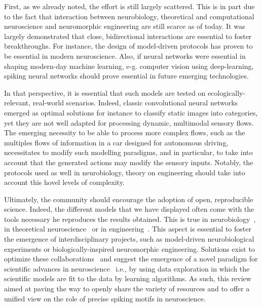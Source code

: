 \documentclass[brainsci, %
               review,submit,pdftex,moreauthors
               ]{Definitions/mdpi}
\begin{document}
First, as we already noted, the effort is still largely scattered. This is in part due to the fact that interaction between neurobiology, theoretical and computational neuroscience and neuromorphic engineering are still scarce as of today. It was largely demonstrated that close, bidirectional interactions are essential to foster breakthroughs. For instance, the design of model-driven protocols has proven to be essential in modern neuroscience. Also, if neural networks were essential in shaping modern-day machine learning, e-g. computer vision using deep-learning, spiking neural networks should prove essential in future emerging technologies.

In that perspective, it is essential that such models are tested on ecologically-relevant, real-world scenarios. Indeed, classic convolutional neural networks emerged as optimal solutions for instance to classify static images into categories, yet they are not well adapted for processing dynamic, multimodal sensory flows. The emerging necessity to be able to process more complex flows, such as the multiples flows of information in a car designed for autonomous driving, necessitates to modify such modelling paradigms, and in particular, to take into account that the generated actions may modify the sensory inputs. Notably, the protocols used as well in neurobiology, theory on engineering should take into account this hovel levels of complexity.

Ultimately, the community should encourage the adoption of open, reproducible science. Indeed, the different models that we have displayed often come with the tools necessary he reproduces the results obtained. This is true in neurobiology~\citep{bellec_fitting_2021}, in theoretical neuroscience~\citep{izhikevich_polychronization_2006} or in engineering~\citep{grimaldi_robust_2022}. This aspect is essential to foster the emergence of interdisciplinary projects, such as model-driven neurobiological experiments or biologically-inspired neuromorphic engineering. Solutions exist to optimize these collaborations~\citep{panahi_generative_2021} and suggest the emergence of a novel paradigm for scientific advances in neuroscience~\citep{tolle_fourth_2011} i.e., by using data exploration in which the scientific models are fit to the data by learning algorithms. As such, this review aimed at paving the way to openly share the variety of resources and to offer a unified view on the role of precise spiking motifs in neuroscience.
\vspace{6pt} 
\end{document}
